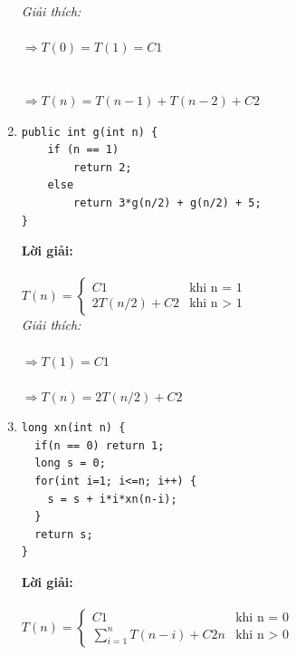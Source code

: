 \documentclass[12pt, letterpaper]{article}
\begin{document}
\begin{enumerate}
	      \textit{Giải thích:} \\
	       \\
	      $\Rightarrow T(0) = T(1) = C1$ \\
	       \\
	       \\
	      $\Rightarrow T(n) = T(n-1) + T(n-2) + C2$ \\

	\item \begin{lstlisting}
public int g(int n) {
    if (n == 1)
        return 2;
    else
        return 3*g(n/2) + g(n/2) + 5;
}
    \end{lstlisting}
	      \textbf{Lời giải:} \\ \\
	      $T(n) =
		      \begin{cases}
			      C1           & \text{khi n = 1} \\
			      2T(n/2) + C2 & \text{khi n > 1}
		      \end{cases}$ \\

	      \textit{Giải thích:} \\
	       \\
	      $\Rightarrow T(1) = C1$ \\
	       \\
	      $\Rightarrow T(n) = 2T(n/2) + C2$ \\

	\item \begin{lstlisting}
long xn(int n) {
  if(n == 0) return 1;
  long s = 0;
  for(int i=1; i<=n; i++) {
    s = s + i*i*xn(n-i);
  }
  return s;
}
	\end{lstlisting}
	      \textbf{Lời giải:} \\ \\
	      $T(n) =
		      \begin{cases}
			      C1                          & \text{khi n = 0} \\
			      \sum_{i=1}^{n} T(n-i) + C2n & \text{khi n > 0}
		      \end{cases}$ \\


\end{enumerate}
\end{document}
